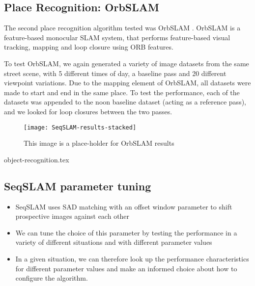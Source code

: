 \documentclass[letterpaper, 10 pt, conference]{ieeeconf}  %
\begin{document}


\subsection{Place Recognition: OrbSLAM}

The second place recognition algorithm tested was OrbSLAM \cite{Montiel2015}. OrbSLAM is a feature-based monocular SLAM system, that performs feature-based visual tracking, mapping and loop closure using ORB features.

To test OrbSLAM, we again generated a variety of image datasets from the same street scene, with 5 different times of day, a baseline pass and 20 different viewpoint variations. Due to the mapping element of OrbSLAM, all datasets were made to start and end in the same place. To test the performance, each of the datasets was appended to the noon baseline dataset (acting as a reference pass), and we looked for loop closures between the two passes. %


\begin{figure}[t]
    \texttt{[image: SeqSLAM-results-stacked]}
    \caption{This image is a place-holder for OrbSLAM results }
    \label{fig:seqslam-results-stacked}
\end{figure}

{object-recognition.tex}

\subsection{SeqSLAM parameter tuning}

\begin{itemize}
    \item SeqSLAM uses SAD matching with an offset window parameter to shift prospective images against each other
    \item We can tune the choice of this parameter by testing the performance in a variety of different situations and with different parameter values
    \item In a given situation, we can therefore look up the performance characteristics for different parameter values and make an informed choice about how to configure the algorithm.
\end{itemize}
\end{document}

